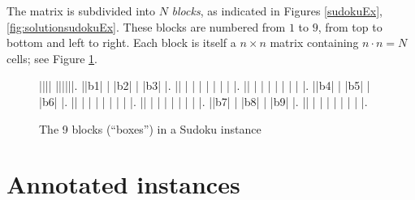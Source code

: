 \documentclass[11pt]{report}
\begin{document}
The matrix is subdivided into $N$ \textit{blocks}, as indicated in Figures \ref{sudokuEx}, \ref{fig:solutionsudokuEx}. These blocks are numbered from $1$ to $9$, from top to bottom and left to right. Each block is itself a $n \times n$ matrix containing $n \cdot n = N$ cells; see Figure \ref{fig:exampleblock}.

\begin{figure}[htbp]
\begin{sudoku}
 |{}|{}|{}| {}|{}|{}|{}|{}|{}|.
 |{}|{\LARGE b1}| | |{\LARGE b2}| | |{\LARGE b3}| |.
 |{}| | | | | | | | |.
 |{}| | | | | | | | |.
 |{}|{\LARGE b4}| | |{\LARGE b5}| | |{\LARGE b6}| |.
 |{}| | | | | | | | |.
 |{}| | | | | | | | |.
 |{}|{\LARGE b7}| | |{\LARGE b8}| | |{\LARGE b9}| |.
 |{}| | | | | | | | |.
\end{sudoku}
\caption{The 9 blocks (``boxes'') in a Sudoku instance}
\label{fig:exampleblock}
\end{figure}



\section{Annotated instances}
\label{sec:Annotatedinstances}
\end{document}
